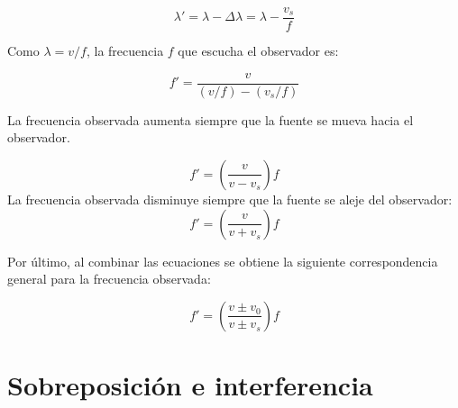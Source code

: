 \documentclass[10pt]{article}
\begin{document}
\begin{equation*}
	\lambda' = \lambda - \Delta \lambda = \lambda - \dfrac{v_s}{f}
\end{equation*}


Como $\lambda = v/f$, la frecuencia $f$ que escucha el observador es:

\begin{equation*}
	f' = \dfrac{v}{(v/f)-(v_s/f)}	
\end{equation*}

La frecuencia observada aumenta siempre que la fuente se mueva hacia el observador.

\begin{equation*}
	f' = \left( \dfrac{v}{v-v_s}\right)f
\end{equation*}
La frecuencia observada disminuye siempre que la fuente se aleje del observador:
\begin{equation*}
	f' = \left( \dfrac{v}{v+v_s}\right)f
\end{equation*}

Por último, al combinar las ecuaciones se obtiene la siguiente correspondencia general para la frecuencia observada:

\begin{equation*}
	f' = \left( \dfrac{v \pm v_0}{v \pm v_s}\right)f
\end{equation*}

\pagebreak

\section{Sobreposición e interferencia}
\end{document}
